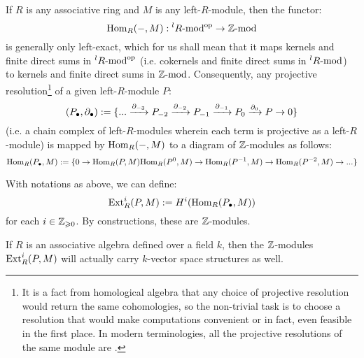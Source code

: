         If $R$ is any associative ring and $M$ is any left-$R$-module, then the functor:
            $$\Hom_R(-, M): {}^lR\mod^{\op} \to \Z\mod$$
        is generally only left-exact, which for us shall mean that it maps kernels and finite direct sums in ${}^lR\mod^{\op}$ (i.e. cokernels and finite direct sums in ${}^lR\mod$) to kernels and finite direct sums in $\Z\mod$. Consequently, any projective resolution\footnote{It is a fact from homological algebra that any choice of projective resolution would return the same cohomologies, so the non-trivial task is to choose a resolution that would make computations convenient or in fact, even feasible in the first place. In modern terminologies, all the projective resolutions of the same module are .} of a given left-$R$-module $P$:
            $$(P_{\bullet}, \del_{\bullet}) := \{ ... \xrightarrow[]{\del_{-3}} P_{-2} \xrightarrow[]{\del_{-2}} P_{-1} \xrightarrow[]{\del_{-1}} P_0 \xrightarrow[]{\del_0} P \to 0 \}$$
        (i.e. a chain complex of left-$R$-modules wherein each term is projective as a left-$R$-module) is mapped by $\Hom_R(-, M)$ to a diagram of $\Z$-modules as follows:
            $$\Hom_R(P_{\bullet}, M) := \{ 0 \to \Hom_R(P, M) \Hom_R(P^0, M) \to \Hom_R(P^{-1}, M) \to \Hom_R(P^{-2}, M) \to ... \}$$
        \begin{definition} \label{def: Ext_groups}
            With notations as above, we can define:
                $$\Ext^i_R(P, M) := H^i(\Hom_R(P_{\bullet}, M))$$
            for each $i \in \Z_{\geq 0}$. By constructions, these are $\Z$-modules. 
        \end{definition}
        \begin{remark}
            If $R$ is an associative algebra defined over a field $k$, then the $\Z$-modules $\Ext^i_R(P, M)$ will actually carry $k$-vector space structures as well.
        \end{remark}
